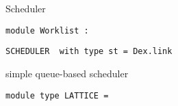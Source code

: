 \documentclass[11pt]{article}
\begin{document}
\begin{ocamldocdescription}
Scheduler


\end{ocamldocdescription}




\begin{ocamldoccode}
{\tt{module }}{\tt{Worklist}}{\tt{ : }}\end{ocamldoccode}
\label{module:Dataflow.Worklist}

{\tt{SCHEDULER}}{\tt{ }}{\tt{ with type st = Dex.link}}

\begin{ocamldocdescription}
simple queue-based scheduler


\end{ocamldocdescription}




\begin{ocamldoccode}
{\tt{module type }}{\tt{LATTICE}}{\tt{ = }}\end{ocamldoccode}
\label{moduletype:Dataflow.LATTICE}
\end{document}
